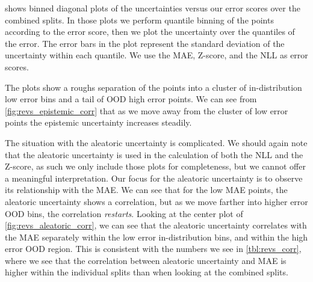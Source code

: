 shows binned diagonal plots of the uncertainties versus our error scores over the combined splits. In those plots we perform quantile binning of the points according to the error score, then we plot the uncertainty over the quantiles of the error. The error bars in the plot represent the standard deviation of the uncertainty within each quantile. We use the MAE, Z-score, and the NLL as error scores. 

The plots show a roughs separation of the points into a cluster of in-distribution low error bins and a tail of OOD high error points. We can see from \cref{fig:revs_epistemic_corr} that as we move away from the cluster of low error points the epistemic uncertainty increases steadily.   

The situation with the aleatoric uncertainty is complicated. We should again note that the aleatoric uncertainty is used in the calculation of both the NLL and the Z-score, as such we only include those plots for completeness, but we cannot offer a meaningful interpretation. Our focus for the aleatoric uncertainty is to observe its relationship with the MAE. We can see that for the low MAE points, the aleatoric uncertainty shows a correlation, but as we move farther into higher error OOD bins, the correlation \emph{restarts}. Looking at the center plot of \cref{fig:revs_aleatoric_corr}, we can see that the aleatoric uncertainty correlates with the MAE separately within the low error in-distribution bins, and within the high error OOD region.
This is consistent with the numbers we see in \cref{tbl:revs_corr}, where we see that the correlation between aleatoric uncertainty and MAE is higher within the individual splits than when looking at the combined splits.

